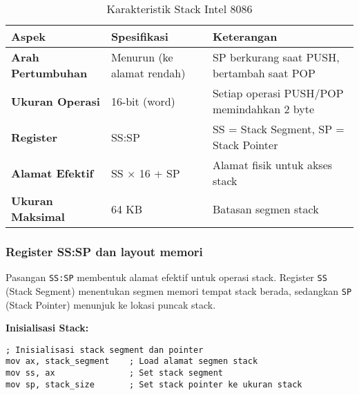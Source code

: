 \documentclass[../main.tex]{subfiles}
\begin{document}
                \begin{table}[H]
                    \centering
                    \caption{Karakteristik Stack Intel 8086}
                    \begin{tabular}{|p{3cm}|p{4cm}|p{6cm}|}
                        \hline
                        \textbf{Aspek} & \textbf{Spesifikasi} & \textbf{Keterangan} \\
                        \hline
                        \textbf{Arah Pertumbuhan} & Menurun (ke alamat rendah) & SP berkurang saat PUSH, bertambah saat POP \\
                        \hline
                        \textbf{Ukuran Operasi} & 16-bit (word) & Setiap operasi PUSH/POP memindahkan 2 byte \\
                        \hline
                        \textbf{Register} & SS:SP & SS = Stack Segment, SP = Stack Pointer \\
                        \hline
                        \textbf{Alamat Efektif} & SS × 16 + SP & Alamat fisik untuk akses stack \\
                        \hline
                        \textbf{Ukuran Maksimal} & 64 KB & Batasan segmen stack \\
                        \hline
                    \end{tabular}
                    \label{tab:stack-characteristics}
                \end{table}

            \subsubsection{Register SS:SP dan layout memori}
                Pasangan \texttt{SS:SP} membentuk alamat efektif untuk operasi stack. Register \texttt{SS} (Stack Segment) menentukan segmen memori tempat stack berada, sedangkan \texttt{SP} (Stack Pointer) menunjuk ke lokasi puncak stack. 

                \textbf{Inisialisasi Stack:}
                \begin{lstlisting}[language={[x86masm]Assembler}, caption=Inisialisasi Stack, label={lst:stack-init}]
; Inisialisasi stack segment dan pointer
mov ax, stack_segment    ; Load alamat segmen stack
mov ss, ax               ; Set stack segment
mov sp, stack_size       ; Set stack pointer ke ukuran stack
                \end{lstlisting}
\end{document}

